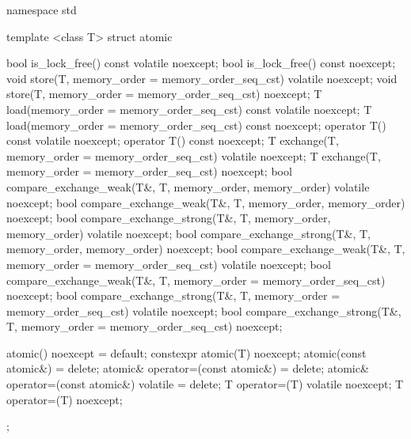 \begin{codeblock}
namespace std {
  template <class T> struct atomic {
    bool is_lock_free() const volatile noexcept;
    bool is_lock_free() const noexcept;
    void store(T, memory_order = memory_order_seq_cst) volatile noexcept;
    void store(T, memory_order = memory_order_seq_cst) noexcept;
    T load(memory_order = memory_order_seq_cst) const volatile noexcept;
    T load(memory_order = memory_order_seq_cst) const noexcept;
    operator T() const volatile noexcept;
    operator T() const noexcept;
    T exchange(T, memory_order = memory_order_seq_cst) volatile noexcept;
    T exchange(T, memory_order = memory_order_seq_cst) noexcept;
    bool compare_exchange_weak(T&, T, memory_order, memory_order) volatile noexcept;
    bool compare_exchange_weak(T&, T, memory_order, memory_order) noexcept;
    bool compare_exchange_strong(T&, T, memory_order, memory_order) volatile noexcept;
    bool compare_exchange_strong(T&, T, memory_order, memory_order) noexcept;
    bool compare_exchange_weak(T&, T, memory_order = memory_order_seq_cst) volatile noexcept;
    bool compare_exchange_weak(T&, T, memory_order = memory_order_seq_cst) noexcept;
    bool compare_exchange_strong(T&, T, memory_order = memory_order_seq_cst) volatile noexcept;
    bool compare_exchange_strong(T&, T, memory_order = memory_order_seq_cst) noexcept;

    atomic() noexcept = default;
    constexpr atomic(T) noexcept;
    atomic(const atomic&) = delete;
    atomic& operator=(const atomic&) = delete;
    atomic& operator=(const atomic&) volatile = delete;
    T operator=(T) volatile noexcept;
    T operator=(T) noexcept;
  };

}
\end{codeblock}
